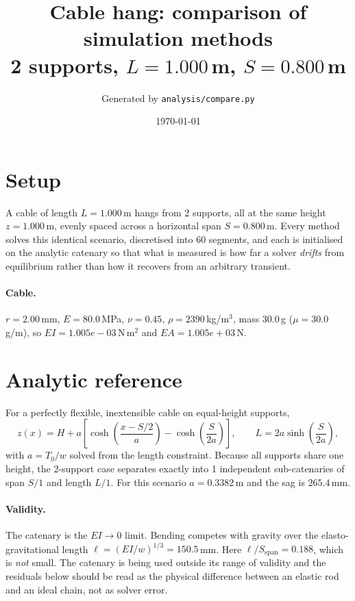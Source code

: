 \documentclass[11pt,a4paper]{article}
\title{Cable hang: comparison of simulation methods\\
\large 2 supports, $L = 1.000$\,m,
$S = 0.800$\,m}
\author{Generated by \texttt{analysis/compare.py}}
\date{\today}
\begin{document}
\maketitle

\section{Setup}

A cable of length $L = 1.000$\,m hangs from
2 supports, all at the same height
$z = 1.000$\,m, evenly spaced across a horizontal span
$S = 0.800$\,m. Every method solves this identical scenario,
discretised into 60 segments, and each is initialised on
the analytic catenary so that what is measured is how far a solver
\emph{drifts} from equilibrium rather than how it recovers from an arbitrary
transient.

\paragraph{Cable.} $r = 2.00$\,mm,
$E = 80.0$\,MPa, $\nu = 0.45$,
$\rho = 2390$\,kg/m$^3$, mass $30.0$\,g
($\mu = 30.0$\,g/m), so
$EI = 1.005e-03$\,N\,m$^2$ and
$EA = 1.005e+03$\,N.

\section{Analytic reference}

For a perfectly flexible, inextensible cable on equal-height supports,
\begin{equation}
  z(x) = H + a\left[\cosh\!\left(\frac{x - S/2}{a}\right)
                    - \cosh\!\left(\frac{S}{2a}\right)\right],
  \qquad L = 2a\sinh\!\left(\frac{S}{2a}\right),
\end{equation}
with $a = T_0/w$ solved from the length constraint. Because all supports share
one height, the 2-support case separates exactly into
1 independent sub-catenaries of span
$S/1$ and length $L/1$.
For this scenario $a = 0.3382$\,m and the sag is
$265.4$\,mm.

\paragraph{Validity.} The catenary is the $EI \to 0$ limit. Bending competes
with gravity over the elasto-gravitational length
$\ell = (EI/w)^{1/3} = 150.5$\,mm. Here $\ell/S_{\mathrm{span}} = 0.188$, which is \emph{not} small. The catenary is being used outside its range of validity and the residuals below should be read as the physical difference between an elastic rod and an ideal chain, not as solver error.
\end{document}

